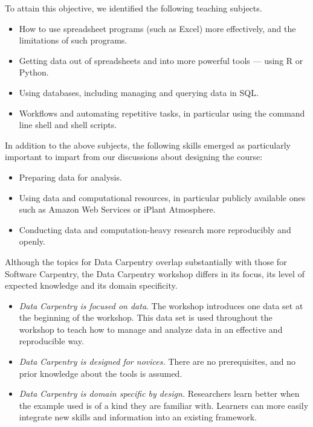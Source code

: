 \documentclass[15]{idcc}
\begin{document}
To attain this objective, we identified the following teaching subjects. 
\begin{itemize}
\item How to use spreadsheet programs (such as Excel) more effectively, and the limitations of such programs. 
\item Getting data out of spreadsheets and into more powerful tools --- using R or Python. 
\item Using databases, including managing and querying data in SQL. 
\item Workflows and automating repetitive tasks, in particular using the command line shell and shell scripts. 
\end{itemize}

In addition to the above subjects, the following skills emerged as particularly important to impart from our discussions about designing the course:
\begin{itemize} 
\item Preparing data for analysis. 
\item Using data and computational resources, in particular publicly available ones such as Amazon Web Services or iPlant Atmosphere. 
\item Conducting data and computation-heavy research more reproducibly and openly. 
\end{itemize}


Although the topics for Data Carpentry overlap substantially with those for Software Carpentry, the Data Carpentry workshop differs in its focus, its level of expected knowledge and its domain specificity. 
\begin{itemize} 
\item \emph{Data Carpentry is focused on data}. The workshop introduces one data set at the beginning of the workshop. This data set is used throughout the workshop to teach how to manage and analyze data in an effective and reproducible way. 
\item \emph{Data Carpentry is designed for novices.} There are no prerequisites, and no prior knowledge about the tools is assumed. 
\item \emph{Data Carpentry is domain specific by design.} Researchers learn better when the example used is of a kind they are familiar with. Learners can more easily integrate new skills and information into an existing framework.
\end{itemize}
\end{document}
